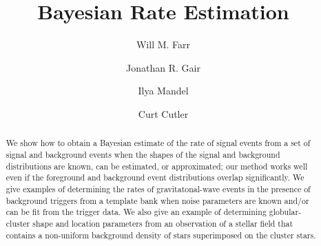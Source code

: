 \documentclass[aps,prd]{revtex4-1}
\begin{document}
\title{Bayesian Rate Estimation}

\author{Will M. Farr} 

\author{Jonathan R. Gair} 

\author{Ilya Mandel} 
 
  
\author{Curt Cutler} 
 



\begin{abstract}
  We show how to obtain a Bayesian estimate of the rate of signal
  events from a set of signal and background events when the shapes of
  the signal and background distributions are known, can be estimated,
  or approximated; our method works well even if the foreground and
  background event distributions overlap significantly.  We give
  examples of determining the rates of gravitatonal-wave events in the
  presence of background triggers from a template bank when noise
  parameters are known and/or can be fit from the trigger data.  We
  also give an example of determining globular-cluster shape and
  location parameters from an observation of a stellar field that
  contains a non-uniform background density of stars superimposed on
  the cluster stars.
\end{abstract}

\maketitle
\end{document}
